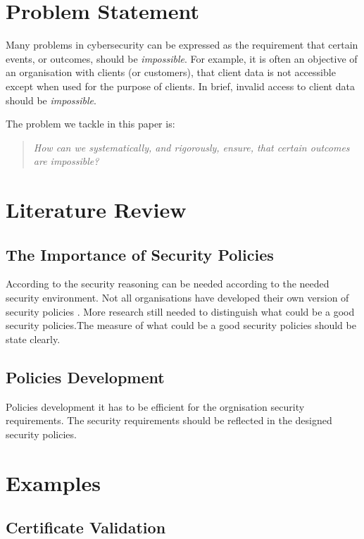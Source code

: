 \documentclass[journal]{IEEEtran}
\begin{document}
\section{Problem Statement}

Many problems in cybersecurity can be expressed as the requirement that certain
events, or outcomes, should be {\em impossible}. 
For example, it is often an objective of an organisation with clients (or
customers), that client data is not accessible except when used for the purpose
of clients. In brief, invalid access to client data should be {\em impossible}.

The problem we tackle in this paper is:
\begin{quote}\em
	How can we systematically, and rigorously, ensure, that 
	certain outcomes are impossible?
\end{quote}


\section{Literature Review}

\subsection{The Importance of Security Policies}
According to \cite{glasgow1992logic} the security reasoning can be needed according to the needed security environment. 
Not all organisations have developed their own version of security policies \cite{paananen2020state}. More research 
still needed to distinguish what could be a good security policies.The measure of what could be a good security policies 
should be state clearly.

\subsection{Policies Development}
Policies development it has to be efficient for the orgnisation security requirements. The security requirements should 
be reflected in the designed security policies.

\section{Examples}

\subsection{Certificate Validation}
\end{document}
